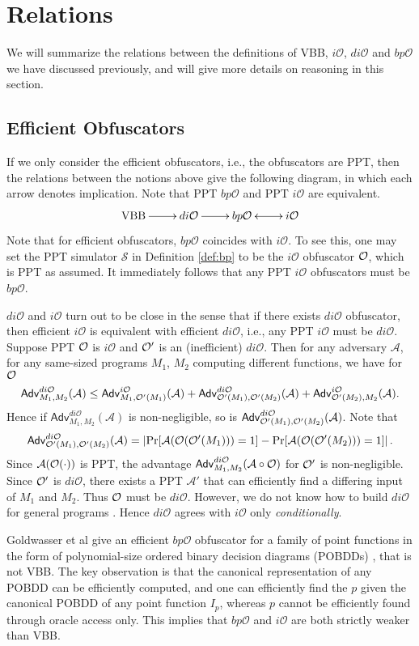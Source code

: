 \documentclass[12pt]{article}
\newcommand{\A}{\mathcal{A}}
\newcommand{\Sim}{\mathcal{S}}
\newcommand{\Adv}{\mathsf{Adv}}
\newcommand{\io}{i\mathcal{O}}
\newcommand{\dio}{di\mathcal{O}}
\newcommand{\bpo}{bp\mathcal{O}}
\theoremstyle{definition}
\begin{document}
\section{Relations}
\label{sec:rel}
We will summarize the relations between the definitions of VBB, $\io$, $\dio$ and $\bpo$ we have discussed previously, and will give more details on reasoning in this section.

\subsection{Efficient Obfuscators}
If we only consider the efficient obfuscators, i.e., the obfuscators are PPT, then the relations between the notions above give the following diagram, in which each arrow denotes implication. Note that PPT $\bpo$ and PPT $\io$ are equivalent.
$$
\xymatrix{
\mathrm{VBB} \ar[r] & \dio \ar[r] & \bpo \ar@{<->}[r] & \io} 
$$
Note that for efficient obfuscators, $\bpo$ coincides with $\io$. To see this, one may set the PPT simulator $\Sim$ in Definition \ref{def:bp} to be the $\io$ obfuscator $\mathcal{O}$, which is PPT as assumed. It immediately follows that any PPT $\io$ obfuscators must be $\bpo$.

$\dio$ and $\io$ turn out to be close in the sense that if there exists $\dio$ obfuscator, then efficient $\io$ is equivalent with efficient $\dio$, i.e., any PPT $\io$ must be $\dio$. Suppose PPT $\mathcal{O}$ is $\io$ and $\mathcal{O}'$ is an (inefficient) $\dio$. Then for any adversary $\A$, for any same-sized programs $M_1$, $M_2$ computing different functions, we have for $\mathcal{O}$
$$\Adv_{M_1,M_2}^{\dio}(\A) \leq \Adv_{M_1,\bigoh'(M_1)}^{\io}(\A) + \Adv_{\bigoh'(M_1),\bigoh'(M_2)}^{\dio}(\A) + \Adv_{\bigoh'(M_2),M_2}^{\io}(\A).$$
Hence if $\Adv_{M_1,M_2}^{\dio}(\A)$ is non-negligible, so is $\Adv_{\bigoh'(M_1),\bigoh'(M_2)}^{\dio}(\A)$.
Note that
$$\Adv_{\bigoh'(M_1),\bigoh'(M_2)}^{\dio}(\A) = \left| \Pr[\A(\bigoh(\bigoh'(M_1)))=1] - \Pr[\A(\bigoh(\bigoh'(M_2)))=1] \right|.$$
Since $\A(\bigoh(\cdot))$ is PPT, the advantage $\Adv_{M_1,M_2}^{\dio}(\A\circ\bigoh)$ for $\mathcal{O}'$ is non-negligible. Since $\mathcal{O}'$ is $\dio$, there exists a PPT $\A'$ that can efficiently find a differing input of $M_1$ and $M_2$. Thus $\mathcal{O}$ must be $\dio$. However, we do not know how to build $\dio$ for general programs \cite{garg2014implausibility}. Hence $\dio$ agrees with $\io$ only \emph{conditionally}.

Goldwasser et al \cite{goldwasser2007best} give an efficient $\bpo$ obfuscator for a family of point functions in the form of polynomial-size ordered binary decision diagrams (POBDDs) \cite{bryant1986graph}, that is not VBB. The key observation is that the canonical representation of any POBDD can be efficiently computed, and one can efficiently find the $p$ given the canonical POBDD of any point function $I_p$, whereas $p$ cannot be efficiently found through oracle access only. This implies that $\bpo$ and $\io$ are both strictly weaker than VBB.
\end{document}
